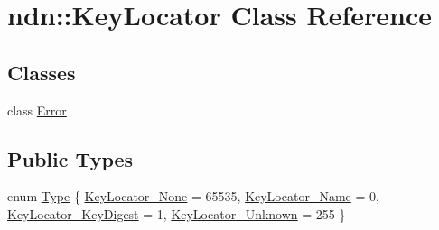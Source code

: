 \hypertarget{classndn_1_1KeyLocator}{}\section{ndn\+:\+:Key\+Locator Class Reference}
\label{classndn_1_1KeyLocator}
\subsection*{Classes}
\begin{DoxyCompactItemize}
\item 
class \hyperlink{classndn_1_1KeyLocator_1_1Error}{Error}
\end{DoxyCompactItemize}
\subsection*{Public Types}
\begin{DoxyCompactItemize}
\item 
enum \hyperlink{classndn_1_1KeyLocator_acede373a69c62b274b2356134ff1d689}{Type} \{ \hyperlink{classndn_1_1KeyLocator_acede373a69c62b274b2356134ff1d689a8e362258492b2ee32bc1ba1b2ad0753d}{Key\+Locator\+\_\+\+None} = 65535, 
\hyperlink{classndn_1_1KeyLocator_acede373a69c62b274b2356134ff1d689a3bd27486d6e08187e6e61c32e870cb01}{Key\+Locator\+\_\+\+Name} = 0, 
\hyperlink{classndn_1_1KeyLocator_acede373a69c62b274b2356134ff1d689a750280e5bc9852648a92aa337d935c76}{Key\+Locator\+\_\+\+Key\+Digest} = 1, 
\hyperlink{classndn_1_1KeyLocator_acede373a69c62b274b2356134ff1d689abf88ec309ba29b12ff05f1017eb7b1cf}{Key\+Locator\+\_\+\+Unknown} = 255
 \}
\end{DoxyCompactItemize}
